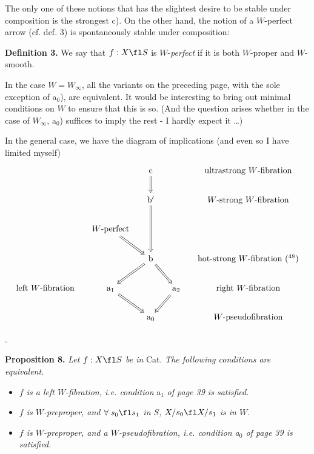 The only one of these notions that has the slightest desire to be stable under composition is the strongest c). On the other hand, the notion of a $W$-perfect arrow (cf. def. 3) is spontaneously stable under composition:

\textbf{Definition 3.} We say that $f : X\fl S$ is $W$-\textit{perfect} if it is both $W$-proper and $W$-smooth.

In the case $W=W_\infty$, all the variants on the preceding page, with the sole exception of a$_0$), are equivalent. It would be interesting to bring out minimal conditions on $W$ to ensure that this is so. (And the question arises whether in the case of $W_\infty$, a$_0$) suffices to imply the rest - I hardly expect it \dots)

In the general case, we have the diagram of implications (and even so I have limited myself)
\[
\begin{tikzcd}[column sep=small]
 & & \mathrm{c} \arrow[d, Rightarrow] & & \text{ultrastrong $W$-fibration} \\
 & & \mathrm{b}' \arrow[dd, Rightarrow] & & \text{$W$-strong $W$-fibration} \\
 & \text{$W$-perfect} \arrow[dr, Rightarrow] & & & \\
 & & \mathrm{b} \arrow[dl, Rightarrow] \arrow[dr, Rightarrow] & & \text{hot-strong $W$-fibration (\footnotemark[48])} \\
\text{left $W$-fibration} & \mathrm{a}_1 \arrow[dr, Rightarrow] & & \mathrm{a}_2 \arrow[dl, Rightarrow] & \text{right $W$-fibration} \\
 & & \mathrm{a}_0 & & \text{$W$-pseudofibration}
\end{tikzcd}
\]

.

\textbf{Proposition 8.} \textit{Let $f : X\fl S$ be in} Cat. \textit{The following conditions are equivalent.}

\begin{itemize}
\item[\textit{a)}] \textit{$f$ is a left $W$-fibration, i.e. condition} a$_1$ \textit{of page 39 is satisfied.}

\item[\textit{b)}] \textit{$f$ is $W$-preproper, and $\forall\; s_0\fl s_1$ in $S$, $X/s_0\fl X/s_1$ is in $W$.}

\item[\textit{c)}] \textit{$f$ is $W$-preproper, and a $W$-pseudofibration, i.e. condition a$_0$ of page 39 is satisfied.} %
\end{itemize}

